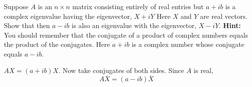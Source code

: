 \begin{enumialphparenastyle}
\begin{ex} Suppose $A$ is an $n\times n$ matrix consisting entirely of real
entries but $a+ib$ is a complex eigenvalue having the eigenvector, $X+iY$ Here $X$ and $Y$ are real vectors. Show
that then $a-ib$ is also an eigenvalue with the eigenvector, $X-iY$. \textbf{Hint: }You should remember that the conjugate of a
product of complex numbers equals the product of the conjugates. Here $a+ib$
is a complex number whose conjugate equals $a-ib.$ 
\begin{sol}
 $AX=\left(
a+ib\right)X$. Now take conjugates of both sides. Since $A$ is
real,
\[
A\overline{X}=\left( a-ib\right) \overline{X}
\]
\end{sol}
\end{ex}

\end{enumialphparenastyle}